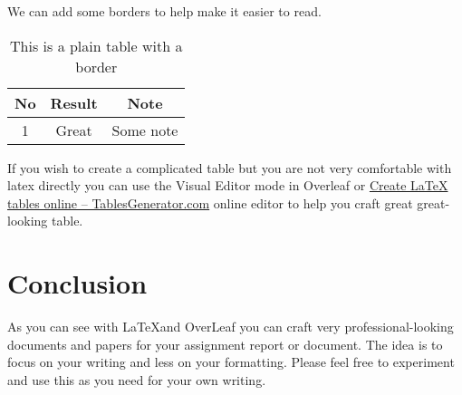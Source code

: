 \documentclass[12pt, a4paper]{article}
\begin{document}
We can add some borders to help make it easier to read.


\begin{table}[h!]
    \centering
    \begin{tabular}{|c|c|c|} \hline 
        No & Result & Note \\ \hline 
        1 & Great & Some note\\ \hline
    \end{tabular}
    \caption{This is a plain table with a border}
    \label{tab:plan_table_border}
\end{table}
If you wish to create a complicated table but you are not very comfortable with latex directly you can use the Visual Editor mode in Overleaf or \href{https://www.tablesgenerator.com/}{Create LaTeX tables online – TablesGenerator.com}  online editor to help you craft great great-looking table.

\begin{table}[]
\caption{A example of a complex table for a machine learning result comparison}
\label{tab:independent-comparison}
\end{table}

\section{Conclusion}
As you can see with \LaTeX and OverLeaf you can craft very professional-looking documents and papers for your assignment report or document. The idea is to focus on your writing and less on your formatting.  Please feel free to experiment and use this as you need for your own writing. 

\printbibliography[title = Reference]
\end{document}
